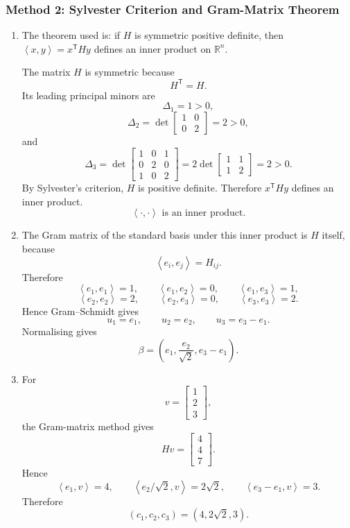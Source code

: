 \documentclass[12pt]{article}
\newcommand{\R}{\mathbb{R}}
\newcommand{\ip}[2]{\left\langle #1,#2\right\rangle}
\newcommand{\T}{\mathsf{T}}
\begin{document}
\subsubsection{Method 2: Sylvester Criterion and Gram-Matrix Theorem}
\begin{enumerate}[label=(\alph*)]
  \item The theorem used is: if $H$ is symmetric positive definite, then $\ip{x}{y}=x^\T Hy$ defines an inner product on $\R^n$.

  The matrix $H$ is symmetric because
  \[
    H^\T=H.
  \]
  Its leading principal minors are
  \[
    \Delta_1=1>0,
  \]
  \[
    \Delta_2=\det\begin{bmatrix}1&0\\0&2\end{bmatrix}=2>0,
  \]
  and
  \[
    \Delta_3=
    \det\begin{bmatrix}
      1&0&1\\
      0&2&0\\
      1&0&2
    \end{bmatrix}
    =2\det\begin{bmatrix}1&1\\1&2\end{bmatrix}
    =2>0.
  \]
  By Sylvester's criterion, $H$ is positive definite. Therefore $x^\T Hy$ defines an inner product.
  \[
    \boxed{\ip{\cdot}{\cdot}\text{ is an inner product}.}
  \]

  \item The Gram matrix of the standard basis under this inner product is $H$ itself, because
  \[
    \ip{e_i}{e_j}=H_{ij}.
  \]
  Therefore
  \[
    \ip{e_1}{e_1}=1,
    \qquad
    \ip{e_1}{e_2}=0,
    \qquad
    \ip{e_1}{e_3}=1,
  \]
  \[
    \ip{e_2}{e_2}=2,
    \qquad
    \ip{e_2}{e_3}=0,
    \qquad
    \ip{e_3}{e_3}=2.
  \]
  Hence Gram--Schmidt gives
  \[
    u_1=e_1,
    \qquad
    u_2=e_2,
    \qquad
    u_3=e_3-e_1.
  \]
  Normalising gives
  \[
    \boxed{
    \beta=
    \left(
    e_1,
    \frac{e_2}{\sqrt2},
    e_3-e_1
    \right).}
  \]

  \item For
  \[
    v=\begin{bmatrix}1\\2\\3\end{bmatrix},
  \]
  the Gram-matrix method gives
  \[
    Hv=\begin{bmatrix}4\\4\\7\end{bmatrix}.
  \]
  Hence
  \[
    \ip{e_1}{v}=4,
    \qquad
    \ip{e_2/\sqrt2}{v}=2\sqrt2,
    \qquad
    \ip{e_3-e_1}{v}=3.
  \]
  Therefore
  \[
    \boxed{(c_1,c_2,c_3)=(4,2\sqrt2,3).}
  \]
\end{enumerate}
\end{document}
